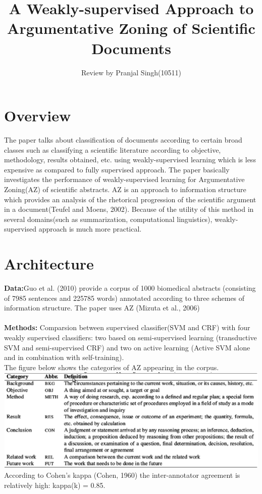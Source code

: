 \documentclass{article}
\title{\textbf{A Weakly-supervised Approach to Argumentative Zoning of Scientific Documents}}
\author{\normalsize Review by Pranjal Singh(10511)\\}
\begin{document}
\maketitle

\section{Overview}
The paper talks about classification of documents according to certain broad classes such as classifying a scientific literature according to objective, methodology, results obtained, etc. using weakly-supervised learning which is less expensive as compared to fully supervised approach. The paper basically investigates the performance of weakly-supervised learning for Argumentative Zoning(AZ) of scientific abstracts. AZ is an approach to information structure which provides an analysis of the rhetorical progression of the scientific argument in a document(Teufel and Moens, 2002). Because of the utility of this method in several domains(such as summarization, computational linguistics), weakly-supervised approach is much more practical.

\section{Architecture}
\textbf{Data:}Guo et al. (2010) provide a corpus of 1000 biomedical abstracts (consisting of 7985 sentences and 225785 words) annotated according to three schemes of information structure. The paper uses AZ (Mizuta et al., 2006)\\ \\
\textbf{Methods:} Comparsion between supervised classifier(SVM and CRF) with four weakly supervised classifiers: two based on semi-supervised learning (transductive SVM and semi-supervised CRF) and two on active learning (Active SVM alone and in combination with self-training).\\
The figure below shows the categories of AZ appearing in the corpus.\\
\includegraphics[height=5cm,width=15cm]{1.eps}\\
According to Cohen’s kappa (Cohen, 1960) the inter-annotator agreement is relatively high: kappa(k) = 0.85.
\end{document}
